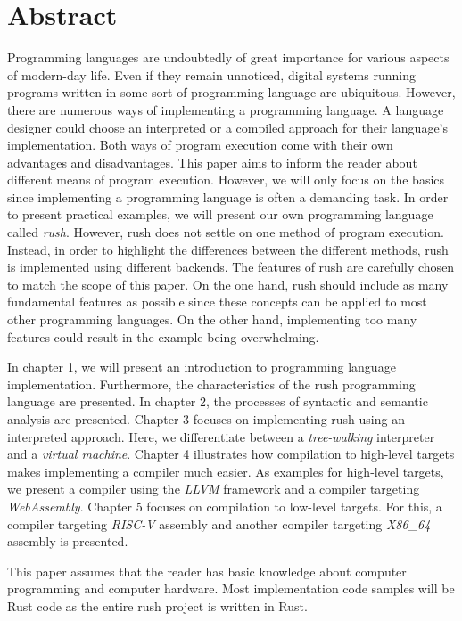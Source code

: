 \chapter*{Abstract}

Programming languages are undoubtedly of great importance for various aspects of
modern-day life. Even if they remain unnoticed, digital systems running programs
written in some sort of programming language are ubiquitous.
However, there are numerous ways of implementing a programming language. A
language designer could choose an interpreted or a compiled approach for their
language's implementation. Both ways of program execution come with their own
advantages and disadvantages.
\newline
This paper aims to inform the reader about different means of program execution.
However, we will only focus on the basics since implementing a programming language is often a demanding task.
In order to present practical examples, we will present our own programming language called \emph{rush}.
However, rush does not settle on one method of program execution. Instead, in
order to highlight the differences between the different methods, rush is implemented using different backends.
The features of rush are carefully chosen to match the scope of this paper.
On the one hand, rush should include as many fundamental features as possible since these concepts can be applied to most other programming languages.
On the other hand, implementing too many features could result in the example being overwhelming.

In chapter 1, we will present an introduction to programming language implementation.
Furthermore, the characteristics of the rush programming language are presented.
In chapter 2, the processes of syntactic and semantic analysis are presented.
Chapter 3 focuses on implementing rush using an interpreted approach.
Here, we differentiate between a \emph{tree-walking} interpreter and a \emph{virtual machine}.
Chapter 4 illustrates how compilation to high-level targets makes implementing a compiler much easier.
As examples for high-level targets, we present a compiler using the \emph{LLVM} framework and a
compiler targeting \emph{WebAssembly}.
Chapter 5 focuses on compilation to low-level targets.
For this, a compiler targeting \emph{RISC-V} assembly and another compiler targeting \emph{X86\_64} assembly is presented.

This paper assumes that the reader has basic knowledge about computer programming and computer hardware.
Most implementation code samples will be Rust code as the entire rush project is written in Rust.
